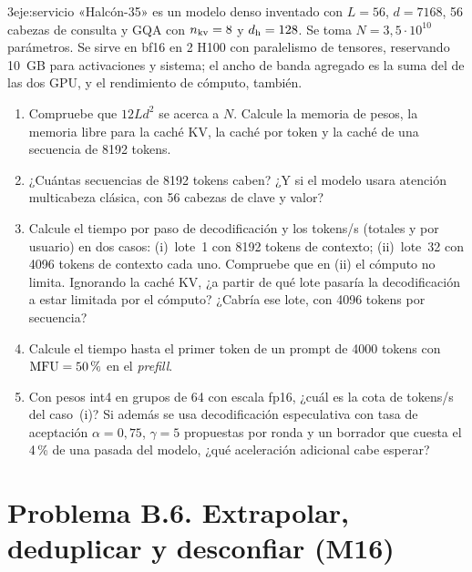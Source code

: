 \begin{ejercicio}{3}{eje:servicio}
«Halcón-35» es un modelo denso inventado con $L=56$, $d=7168$, 56 cabezas de consulta y GQA con $n_{\mathrm{kv}}=8$ y $d_{\mathrm{h}}=128$. Se toma $N=3{,}5\cdot 10^{10}$ parámetros. Se sirve en bf16 en 2 H100 con paralelismo de tensores, reservando 10~GB para activaciones y sistema; el ancho de banda agregado es la suma del de las dos GPU, y el rendimiento de cómputo, también.
\begin{enumerate}[label=(\alph*)]
  \item {} Compruebe que $12Ld^{2}$ se acerca a $N$. Calcule la memoria de pesos, la memoria libre para la caché KV, la caché por token y la caché de una secuencia de 8192 tokens.
  \item {} ¿Cuántas secuencias de 8192 tokens caben? ¿Y si el modelo usara atención multicabeza clásica, con 56 cabezas de clave y valor?
  \item {} Calcule el tiempo por paso de decodificación y los tokens/s (totales y por usuario) en dos casos: (i)~lote~1 con 8192 tokens de contexto; (ii)~lote~32 con 4096 tokens de contexto cada uno. Compruebe que en (ii) el cómputo no limita. Ignorando la caché KV, ¿a partir de qué lote pasaría la decodificación a estar limitada por el cómputo? ¿Cabría ese lote, con 4096 tokens por secuencia?
  \item {} Calcule el tiempo hasta el primer token de un prompt de 4000 tokens con $\mathrm{MFU}=50\,\%$ en el \emph{prefill}.
  \item {} Con pesos int4 en grupos de 64 con escala fp16, ¿cuál es la cota de tokens/s del caso~(i)? Si además se usa decodificación especulativa con tasa de aceptación $\alpha=0{,}75$, $\gamma=5$ propuestas por ronda y un borrador que cuesta el 4\,\% de una pasada del modelo, ¿qué aceleración adicional cabe esperar?
\end{enumerate}
\end{ejercicio}

\section*{Problema B.6. Extrapolar, deduplicar y desconfiar (M16)}

